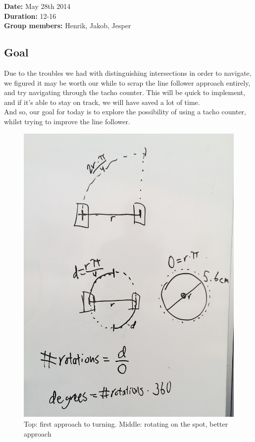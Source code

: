 \textbf{Date:} May 28th 2014\\\textbf{Duration:} 12-16\\\textbf{Group
members:} Henrik, Jakob, Jesper

\subsection{Goal}

Due to the troubles we had with distinguishing intersections in order to
navigate, we figured it may be worth our while to scrap the line
follower approach entirely, and try navigating through the tacho
counter. This will be quick to implement, and if it's able to stay on
track, we will have saved a lot of time.\\And so, our goal for today is
to explore the possibility of using a tacho counter, whilst trying to
improve the line follower.
\begin{figure}[hbt]
  \centering
  \includegraphics[scale=0.1]{../experiments/images/maths.jpg}
\caption{Top: first approach to turning. Middle: rotating on the spot, better approach}
\end{figure}

